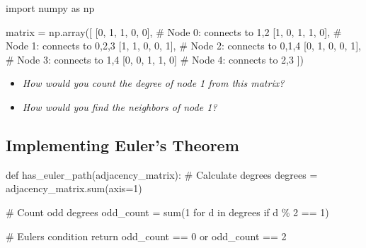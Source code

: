 \documentclass[
  letterpaper,
  DIV=11,
  numbers=noendperiod,
  oneside]{scrartcl}
\newenvironment{Shaded}{}{}
\newcommand{\BuiltInTok}[1]{\textcolor[rgb]{0.84,0.23,0.29}{#1}}
\newcommand{\CommentTok}[1]{\textcolor[rgb]{0.42,0.45,0.49}{#1}}
\newcommand{\ControlFlowTok}[1]{\textcolor[rgb]{0.84,0.23,0.29}{#1}}
\newcommand{\DecValTok}[1]{\textcolor[rgb]{0.00,0.36,0.77}{#1}}
\newcommand{\ImportTok}[1]{\textcolor[rgb]{0.01,0.18,0.38}{#1}}
\newcommand{\KeywordTok}[1]{\textcolor[rgb]{0.84,0.23,0.29}{#1}}
\newcommand{\NormalTok}[1]{\textcolor[rgb]{0.14,0.16,0.18}{#1}}
\newcommand{\OperatorTok}[1]{\textcolor[rgb]{0.14,0.16,0.18}{#1}}
\providecommand{\tightlist}{%
  \setlength{\itemsep}{0pt}\setlength{\parskip}{0pt}}
\begin{document}
\begin{Shaded}
\begin{Highlighting}[]
\ImportTok{import}\NormalTok{ numpy }\ImportTok{as}\NormalTok{ np}

\NormalTok{matrix }\OperatorTok{=}\NormalTok{ np.array([}
\NormalTok{    [}\DecValTok{0}\NormalTok{, }\DecValTok{1}\NormalTok{, }\DecValTok{1}\NormalTok{, }\DecValTok{0}\NormalTok{, }\DecValTok{0}\NormalTok{],  }\CommentTok{\# Node 0: connects to 1,2}
\NormalTok{    [}\DecValTok{1}\NormalTok{, }\DecValTok{0}\NormalTok{, }\DecValTok{1}\NormalTok{, }\DecValTok{1}\NormalTok{, }\DecValTok{0}\NormalTok{],  }\CommentTok{\# Node 1: connects to 0,2,3}
\NormalTok{    [}\DecValTok{1}\NormalTok{, }\DecValTok{1}\NormalTok{, }\DecValTok{0}\NormalTok{, }\DecValTok{0}\NormalTok{, }\DecValTok{1}\NormalTok{],  }\CommentTok{\# Node 2: connects to 0,1,4}
\NormalTok{    [}\DecValTok{0}\NormalTok{, }\DecValTok{1}\NormalTok{, }\DecValTok{0}\NormalTok{, }\DecValTok{0}\NormalTok{, }\DecValTok{1}\NormalTok{],  }\CommentTok{\# Node 3: connects to 1,4}
\NormalTok{    [}\DecValTok{0}\NormalTok{, }\DecValTok{0}\NormalTok{, }\DecValTok{1}\NormalTok{, }\DecValTok{1}\NormalTok{, }\DecValTok{0}\NormalTok{]   }\CommentTok{\# Node 4: connects to 2,3}
\NormalTok{])}
\end{Highlighting}
\end{Shaded}

\begin{itemize}
\tightlist
\item
  \emph{How would you count the degree of node 1 from this matrix?}
\item
  \emph{How would you find the neighbors of node 1?}
\end{itemize}

\subsection{Implementing Euler's Theorem
🧮}\label{implementing-eulers-theorem}

\begin{Shaded}
\begin{Highlighting}[]
\KeywordTok{def}\NormalTok{ has\_euler\_path(adjacency\_matrix):}
    \CommentTok{\# Calculate degrees}
\NormalTok{    degrees }\OperatorTok{=}\NormalTok{ adjacency\_matrix.}\BuiltInTok{sum}\NormalTok{(axis}\OperatorTok{=}\DecValTok{1}\NormalTok{)}

    \CommentTok{\# Count odd degrees}
\NormalTok{    odd\_count }\OperatorTok{=} \BuiltInTok{sum}\NormalTok{(}\DecValTok{1} \ControlFlowTok{for}\NormalTok{ d }\KeywordTok{in}\NormalTok{ degrees }\ControlFlowTok{if}\NormalTok{ d }\OperatorTok{\%} \DecValTok{2} \OperatorTok{==} \DecValTok{1}\NormalTok{)}

    \CommentTok{\# Euler\textquotesingle{}s condition}
    \ControlFlowTok{return}\NormalTok{ odd\_count }\OperatorTok{==} \DecValTok{0} \KeywordTok{or}\NormalTok{ odd\_count }\OperatorTok{==} \DecValTok{2}
\end{Highlighting}
\end{Shaded}
\end{document}
